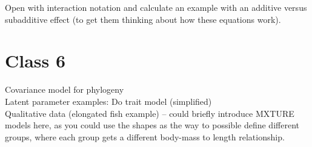 \documentclass[11pt]{article}
\begin{document}
Open with interaction notation and calculate an example with an additive versus subadditive effect (to get them thinking about how these equations work). 

\newpage
\section{Class 6} 


Covariance model for phylogeny\\
Latent parameter examples: Do trait model (simplified)\\
Qualitative data (elongated fish example) -- could briefly introduce MXTURE models here, as you could use the shapes as the way to possible define different groups, where each group gets a different body-mass to length relationship. 
\end{document}
